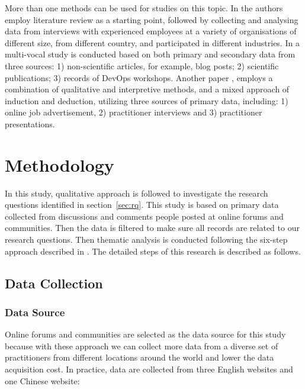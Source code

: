 \documentclass[
  12pt,
  a4paper,
]{article}
\begin{document}
More than one methods can be used for studies on this topic. In
\citep{erich:2017:devops-practice} the authors employ literature review
as a starting point, followed by collecting and analysing data from
interviews with experienced employees at a variety of organisations of
different size, from different country, and participated in different
industries. In \citep{lwakatare2016:relationship} a multi-vocal study is
conducted based on both primary and secondary data from three sources:
1) non-scientific articles, for example, blog posts; 2) scientific
publications; 3) records of DevOps workshops. Another paper
\citep{hussain2017nz}, employs a combination of qualitative and
interpretive methods, and a mixed approach of induction and deduction,
utilizing three sources of primary data, including: 1) online job
advertisement, 2) practitioner interviews and 3) practitioner
presentations.

\hypertarget{sec:meth}{%
\section{Methodology}\label{sec:meth}}

In this study, qualitative approach \citep{Creswell:2014:mixed}
\citep{Holliday:2002:doing-writing-qual} is followed to investigate the
research questions identified in section~\ref{sec:rq}. This study is
based on primary data collected from discussions and comments people
posted at online forums and communities. Then the data is filtered to
make sure all records are related to our research questions. Then
thematic analysis is conducted following the six-step approach described
in \citep{braun:2006:thematic-psy}. The detailed steps of this research
is described as follows.

\hypertarget{data-collection}{%
\subsection{Data Collection}\label{data-collection}}

\hypertarget{data-source}{%
\subsubsection{Data Source}\label{data-source}}

Online forums and communities are selected as the data source for this
study because with these approach we can collect more data from a
diverse set of practitioners from different locations around the world
and lower the data acquisition cost. In practice, data are collected
from three English websites and one Chinese website:
\end{document}
